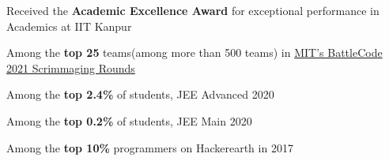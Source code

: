 \vspace{-2mm}
\vspace{3mm}
\begin{cvitems}
  \item Received the \textbf{Academic Excellence Award} for exceptional performance in Academics at IIT Kanpur
  \item Among the \textbf{top 25} teams(among more than 500 teams) in  \href{https://github.com/abhishekshree/BattleCode}{MIT's BattleCode 2021 Scrimmaging Rounds}
  \item Among the\textbf{ top 2.4\%} of students, JEE Advanced 2020
  \item Among the \textbf{top 0.2\%} of students, JEE Main 2020
  \item Among the \textbf{top 10\%} programmers on Hackerearth in 2017
\end{cvitems}
\vspace{2mm}
